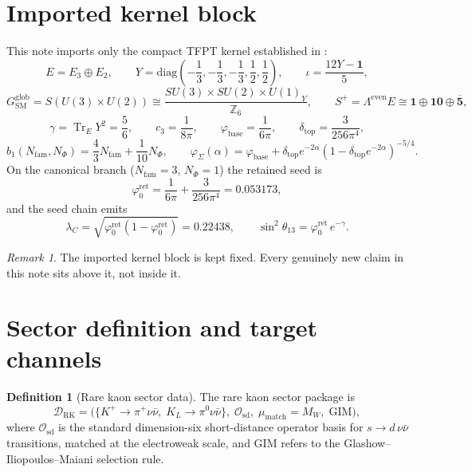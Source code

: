 \documentclass[11pt,a4paper]{article}
\theoremstyle{definition}
\newtheorem{definition}[theorem]{Definition}
\theoremstyle{remark}
\newtheorem*{remark}{Remark}
\DeclareMathOperator{\tr}{Tr}
\newcommand{\inv}{\iota}
\newcommand{\cthree}{c_3}
\newcommand{\bone}{b_1}
\newcommand{\phibase}{\varphi_{\mathrm{base}}}
\newcommand{\phiseam}{\varphi_{\Sigma}}
\newcommand{\phiz}{\varphi_{0}^{\mathrm{ret}}}
\newcommand{\deltatop}{\delta_{\mathrm{top}}}
\newcommand{\gammaY}{\gamma}
\newcommand{\SM}{\mathrm{SM}}
\numberwithin{equation}{section}
\begin{document}
\section{Imported kernel block}
\label{sec:kernel}

This note imports only the compact TFPT kernel established in \cite{TFPT}:
\[
E = E_3\oplus E_2,
\qquad
Y=\mathrm{diag}\!\left(-\frac13,-\frac13,-\frac13,\frac12,\frac12\right),
\qquad
\inv = \frac{12Y-\mathbf 1}{5},
\]
\[
G_{\SM}^{\mathrm{glob}}
=
S(U(3)\times U(2))
\cong
\frac{SU(3)\times SU(2)\times U(1)_Y}{\mathbb Z_6},
\qquad
S^+ = \Lambda^{\mathrm{even}}E \cong \mathbf 1\oplus\mathbf{10}\oplus\overline{\mathbf 5},
\]
\[
\gammaY=\tr_EY^2=\frac56,
\qquad
\cthree=\frac1{8\pi},
\qquad
\phibase=\frac1{6\pi},
\qquad
\deltatop=\frac{3}{256\pi^4},
\]
\[
\bone(N_{\mathrm{fam}},N_\Phi)=\frac43N_{\mathrm{fam}}+\frac1{10}N_\Phi,
\qquad
\phiseam(\alpha)=\phibase+\deltatop e^{-2\alpha}(1-\deltatop e^{-2\alpha})^{-5/4}.
\]
On the canonical branch ($N_{\mathrm{fam}}=3$, $N_\Phi=1$) the retained seed is
\begin{equation}
\label{eq:retained-seed}
\phiz=\frac{1}{6\pi}+\frac{3}{256\pi^4}=\num{0.053173},
\end{equation}
and the seed chain emits
\begin{equation}
\label{eq:seed-chain}
\lambda_C=\sqrt{\phiz(1-\phiz)}=\num{0.22438},
\qquad
\sin^2\theta_{13}=\phiz\, e^{-\gammaY}.
\end{equation}

\begin{remark}
The imported kernel block is kept fixed.
Every genuinely new claim in this note sits above it, not inside it.
\end{remark}


\section{Sector definition and target channels}
\label{sec:sector}

\begin{definition}[Rare kaon sector data]
\label{def:sector-data}
The rare kaon sector package is
\[
\mathcal D_{\mathrm{RK}}
=
\bigl(
\{K^+\!\to\pi^+\nu\bar\nu,\; K_L\to\pi^0\nu\bar\nu\},\;
\mathcal O_{\mathrm{sd}},\;
\mu_{\mathrm{match}}=M_W,\;
\text{GIM}\bigr),
\]
where $\mathcal O_{\mathrm{sd}}$ is the standard dimension-six short-distance operator
basis for $s\to d\,\nu\bar\nu$ transitions, matched at the electroweak scale, and GIM
refers to the Glashow--Iliopoulos--Maiani selection rule.
\end{definition}
\end{document}
